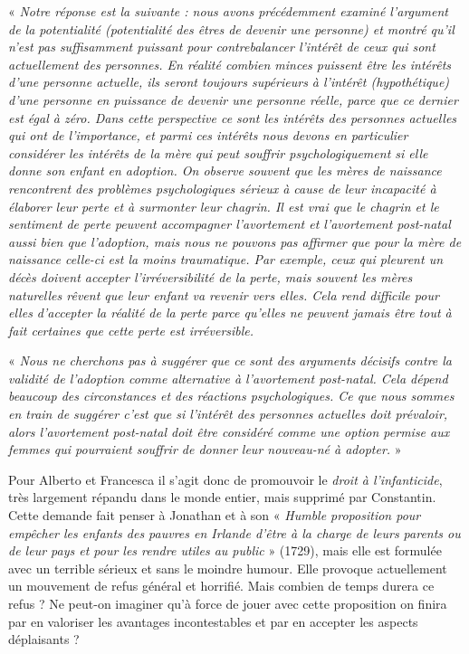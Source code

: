« \emph{Notre réponse est la suivante : nous avons précédemment examiné l'argument de la potentialité (potentialité des êtres de devenir une personne) et montré qu'il n'est pas suffisamment puissant pour contrebalancer l'intérêt de ceux qui sont actuellement des personnes. En réalité combien minces puissent être les intérêts d'une personne actuelle, ils seront toujours supérieurs à l'intérêt (hypothétique) d'une personne en puissance de devenir une personne réelle, parce que ce dernier est égal à zéro. Dans cette perspective ce sont les intérêts des personnes actuelles qui ont de l'importance, et parmi ces intérêts nous devons en particulier considérer les intérêts de la mère qui peut souffrir psychologiquement si elle donne son enfant en adoption. On observe souvent que les mères de naissance rencontrent des problèmes psychologiques sérieux à cause de leur incapacité à élaborer leur perte et à surmonter leur chagrin. Il est vrai que le chagrin et le sentiment de perte peuvent accompagner l'avortement et l'avortement post-natal aussi bien que l'adoption, mais nous ne pouvons pas affirmer que pour la mère de naissance celle-ci est la moins traumatique. Par exemple, ceux qui pleurent un décès doivent accepter l'irréversibilité de la perte, mais souvent les mères naturelles rêvent que leur enfant va revenir vers elles. Cela rend difficile pour elles d'accepter la réalité de la perte parce qu'elles ne peuvent jamais être tout à fait certaines que cette perte est irréversible.}

« \emph{Nous ne cherchons pas à suggérer que ce sont des arguments décisifs contre la validité de l'adoption comme alternative à l'avortement post-natal. Cela dépend beaucoup des circonstances et des réactions psychologiques. Ce que nous sommes en train de suggérer c'est que si l'intérêt des personnes actuelles doit prévaloir, alors l'avortement post-natal doit être considéré comme une option permise aux femmes qui pourraient souffrir de donner leur nouveau-né à adopter.} »

 Pour Alberto  et Francesca   il  s'agit donc de promouvoir le \emph{droit à l'infanticide}, très largement répandu dans le monde entier, mais supprimé par Constantin. Cette demande fait penser à Jonathan  et à son « \emph{Humble proposition pour empêcher les enfants des pauvres en Irlande d'être à la charge de leurs parents ou de leur pays et pour les rendre utiles au public} » (1729), mais elle est formulée avec un terrible sérieux et sans le moindre humour. Elle provoque actuellement un mouvement de refus général et horrifié. Mais combien de temps durera ce refus ? Ne peut-on imaginer qu'à force de jouer avec cette proposition on finira par en valoriser les avantages incontestables et par en accepter les aspects déplaisants ? 
  

